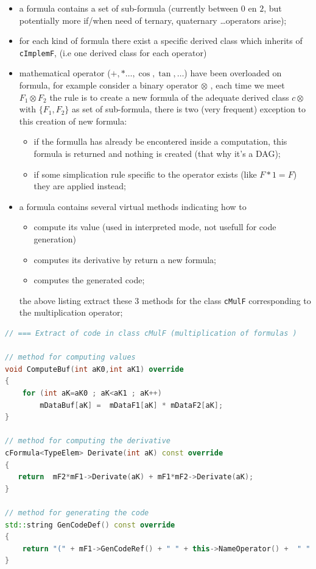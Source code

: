 \begin{itemize}
       \item  a formula contains a set of sub-formula (currently between $0$ en $2$, but potentially more
	       if/when need of ternary, quaternary \dots operators arise);

       \item  for each kind of formula there exist a specific derived class which inherits of  {\tt cImplemF},
	       (i.e one derived class for each operator)

       \item  mathematical operator ($+,*\dots ,\cos,\tan,\dots$) have been overloaded on formula, 
               for example consider a binary operator  $\otimes$ , each time we meet $F_1\otimes F_2$ 
		the rule is to create a new formula of the adequate derived class $c\otimes$ with  
		$\{F_1,F_2\}$ as set of sub-formula,
		there is two (very frequent) exception to this creation of new formula:

               \begin{itemize}
                    \item if the formulla has already be encontered inside a computation, this formula is returned
                          and nothing is created (that why it's a DAG);
		  \item if some simplication rule specific to the operator exists (like $F*1=F$) they are applied instead;
               \end{itemize}
	       
        \item  a formula contains several virtual methods indicating how to 
               \begin{itemize}
		       \item  compute its value (used in interpreted mode, not usefull for code generation)
		       \item  computes its derivative by return a new formula;
		       \item  computes the generated code;
               \end{itemize}

		the above listing extract these $3$ methods for the class {\tt cMulF} corresponding to the multiplication
		operator;
\end{itemize}


\begin{lstlisting}[language=c++]
// === Extract of code in class cMulF (multiplication of formulas )

// method for computing values
void ComputeBuf(int aK0,int aK1) override
{
    for (int aK=aK0 ; aK<aK1 ; aK++)
        mDataBuf[aK] =  mDataF1[aK] * mDataF2[aK];
}

// method for computing the derivative
cFormula<TypeElem> Derivate(int aK) const override
{
   return  mF2*mF1->Derivate(aK) + mF1*mF2->Derivate(aK);
}

// method for generating the code
std::string GenCodeDef() const override 
{
    return "(" + mF1->GenCodeRef() + " " + this->NameOperator() +  " " + mF2->GenCodeRef() + ")";
}

\end{lstlisting}

